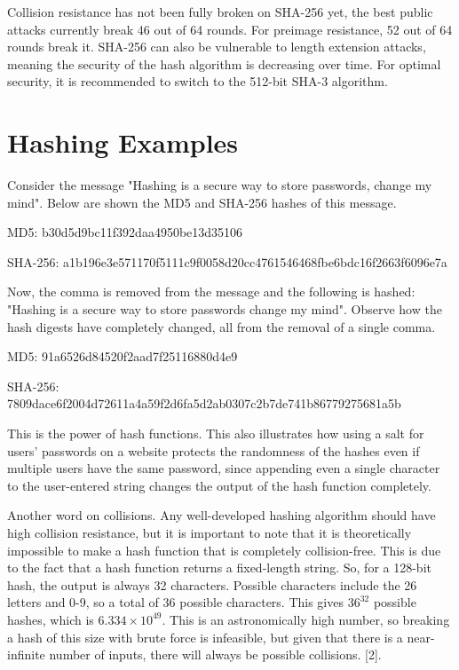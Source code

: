 \documentclass{article}
\begin{document}
Collision resistance has not been fully broken on SHA-256 yet, the best public attacks currently break 46 out of 64 rounds. For preimage resistance, 52 out of 64 rounds break it. SHA-256 can also be vulnerable to length extension attacks, meaning the security of the hash algorithm is decreasing over time. For optimal security, it is recommended to switch to the 512-bit SHA-3 algorithm. 


\section{Hashing Examples}

\tab Consider the message "Hashing is a secure way to store passwords, change my mind". Below are shown the MD5 and SHA-256 hashes of this message.

MD5: b30d5d9bc11f392daa4950be13d35106

SHA-256: a1b196e3e571170f5111c9f0058d20cc4761546468fbe6bdc16f2663f6096e7a

Now, the comma is removed from the message and the following is hashed: "Hashing is a secure way to store passwords change my mind". Observe how the hash digests have completely changed, all from the removal of a single comma.

MD5: 91a6526d84520f2aad7f25116880d4e9

SHA-256: 7809dace6f2004d72611a4a59f2d6fa5d2ab0307c2b7de741b86779275681a5b

This is the power of hash functions. This also illustrates how using a salt for users' passwords on a website protects the randomness of the hashes even if multiple users have the same password, since appending even a single character to the user-entered string changes the output of the hash function completely.

Another word on collisions. Any well-developed hashing algorithm should have high collision resistance, but it is important to note that it is theoretically impossible to make a hash function that is completely collision-free. This is due to the fact that a hash function returns a fixed-length string. So, for a 128-bit hash, the output is always 32 characters. Possible characters include the 26 letters and 0-9, so a total of 36 possible characters. This gives $36^{32}$ possible hashes, which is $6.334 \times 10^{49}$. This is an astronomically high number, so breaking a hash of this size with brute force is infeasible, but given that there is a near-infinite number of inputs, there will always be possible collisions. [2].
\end{document}
